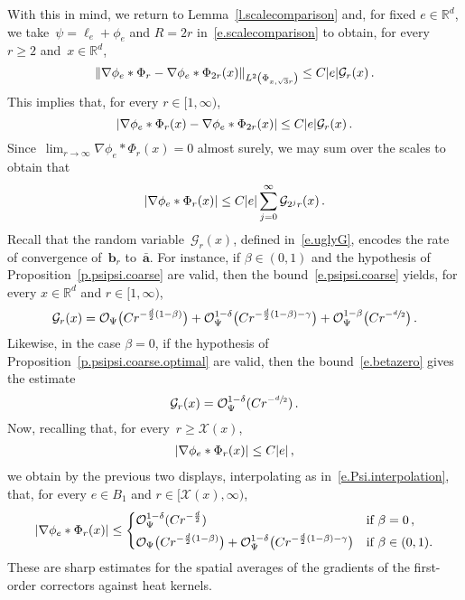 \documentclass[11pt]{article} %
\numberwithin{equation}{section}
\theoremstyle{definition}
\let\originalleft\left
\let\originalright\right
\renewcommand{\left}{\mathopen{}\mathclose\bgroup\originalleft}
\renewcommand{\right}{\aftergroup\egroup\originalright}
\newcommand*{\Rd}{\ensuremath{\mathbb{R}^d}}
\renewcommand{\b}{\ensuremath{\mathbf{b}}}
\renewcommand{\a}{\mathbf{a}}
\newcommand{\ahom}{\bar{\a}}
\newcommand{\X}{\mathcal{X}}
\renewcommand{\O}{\mathcal{O}}
\begin{document}
With this in mind, we return to Lemma~\ref{l.scalecomparison} and, for fixed $e\in\Rd$, we take~$\psi = \ell_e + \phi_e$ and $R=2r$ in~\eqref{e.scalecomparison} to obtain, for every~$r\geq 2$ and~$x\in\Rd$,
\begin{equation}
\label{e.conv.rto2r.0}
\left\| \nabla \phi_e \ast \Phi_r  - \nabla \phi_e \ast \Phi_{2r}(x)\right\|_{L^2 \left( \Phi_{x,\sqrt{3}r} \right)} 
\leq 
C |e| \mathcal{G}_r(x) \,. 
\end{equation}
This implies that, for every $r \in [1,\infty)$, 
\begin{equation}
\label{e.conv.rto2r}
\left| \nabla \phi_e \ast \Phi_r (x) - \nabla \phi_e \ast \Phi_{2r}(x)\right| 
\leq 
C |e| \mathcal{G}_r(x) \,. 
\end{equation}
Since~$\lim_{r\to \infty} \nabla \phi_e \ast \Phi_r (x) = 0$ almost surely, we may sum over the scales to obtain that 
\begin{equation}
\label{e.conv.r}
\left| \nabla \phi_e \ast \Phi_r (x) \right| 
\leq 
C |e| \sum_{j=0}^\infty \mathcal{G}_{2^jr}(x) \,. 
\end{equation}
Recall that the random variable~$\mathcal{G}_r(x)$, defined in~\eqref{e.uglyG}, encodes the rate of convergence of~$\b_r$ to~$\ahom$. For instance, if $\beta\in (0,1)$ and the hypothesis of Proposition~\ref{p.psipsi.coarse} are valid, then the bound~\eqref{e.psipsi.coarse} yields, for every $x\in\Rd$ and $r \in [1,\infty)$, 
\begin{equation}
\label{e.uglyG.bound}
\mathcal{G}_r(x)
=
\O_{\Psi} \bigl( C r^{-\frac d2(1-\beta)} \bigr) 
+ 
\O_{\Psi}^{1-\delta} \bigl( C r^{-\frac d2(1-\beta) - \gamma} \bigr)
+
\O_{\Psi}^{1-\beta} \bigl( C r^{-\sfrac d2} \bigr)
\,.
\end{equation}
Likewise, in the case $\beta=0$, if the hypothesis of Proposition~\ref{p.psipsi.coarse.optimal} are valid, then the bound~\eqref{e.betazero} gives the estimate
\begin{equation}
\label{e.uglyG.bound.betazero}
\mathcal{G}_r(x)
=
\O_{\Psi}^{1-\delta} (C r^{-\sfrac d2})
\,.
\end{equation}
Now, recalling that, for every~$r \geq \X(x)$, 
\begin{align*}  
\left| \nabla \phi_e \ast \Phi_r (x) \right|  \leq C|e| \,,
\end{align*}
we obtain by the previous two displays, interpolating as in~\eqref{e.Psi.interpolation}, 
that, for every $e \in B_1$ and $r \in [\X(x),\infty)$, 
\begin{equation}
\label{e.nablacorr.r}
\left| \nabla \phi_e \ast \Phi_r (x) \right| 
\leq 
\left\{
\begin{aligned}
& \O_{\Psi}^{1-\delta} (C   r^{-\frac d2}) & \mbox{if} & \ \beta = 0\,,\\
&\O_{\Psi} \bigl( C    r^{-\frac d2(1-\beta)} \bigr) + \O_{\Psi}^{1-\delta} \bigl( C r^{-\frac d2(1-\beta) - \gamma} \bigr)
 & \mbox{if} & \ \beta\in (0,1).
\end{aligned}
\right.
\end{equation}
These are sharp estimates for the spatial averages of the gradients of the first-order correctors against heat kernels. 
\end{document}
